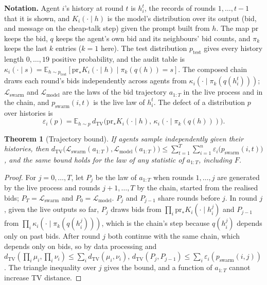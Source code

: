 \documentclass[11pt,letterpaper]{article}
\newtheorem{theorem}{Theorem}
\begin{document}
\textbf{Notation.}
Agent $i$'s history at round $t$ is $h^t_i$, the records of rounds $1, \ldots, t-1$ that it is shown, and $K_i(\cdot \mid h)$ is the model's distribution over its output (bid, and message on the cheap-talk step) given the prompt built from $h$.
The map $\mathrm{pr}$ keeps the bid, $q$ keeps the agent's own bid and its neighbours' bid counts, and $\pi_k$ keeps the last $k$ entries ($k=1$ here).
The test distribution $p_{\mathrm{test}}$ gives every history length $0, \ldots, 19$ positive probability, and the audit table is $\kappa_i(\cdot \mid s) = \mathbb{E}_{h \sim p_{\mathrm{test}}}[\mathrm{pr}_* K_i(\cdot \mid h) \mid \pi_k(q(h)) = s]$.
The composed chain draws each round's bids independently across agents from $\kappa_i(\cdot \mid \pi_k(q(h^t_i)))$; $\mathcal{L}_{\mathrm{swarm}}$ and $\mathcal{L}_{\mathrm{model}}$ are the laws of the bid trajectory $a_{1:T}$ in the live process and in the chain, and $p_{\mathrm{swarm}}(i,t)$ is the live law of $h^t_i$.
The defect of a distribution $p$ over histories is
\[
  \varepsilon_i(p) = \mathbb{E}_{h \sim p}\, d_{\mathrm{TV}}\big(\mathrm{pr}_* K_i(\cdot \mid h),\, \kappa_i(\cdot \mid \pi_k(q(h)))\big).
\]

\begin{theorem}[Trajectory bound]
If agents sample independently given their histories, then
$d_{\mathrm{TV}}\big(\mathcal{L}_{\mathrm{swarm}}(a_{1:T}), \mathcal{L}_{\mathrm{model}}(a_{1:T})\big) \le \sum_{t=1}^{T} \sum_{i=1}^{n} \varepsilon_i\big(p_{\mathrm{swarm}}(i,t)\big)$,
and the same bound holds for the law of any statistic of $a_{1:T}$, including $F$.
\end{theorem}

\begin{proof}
For $j = 0, \ldots, T$, let $P_j$ be the law of $a_{1:T}$ when rounds $1, \ldots, j$ are generated by the live process and rounds $j+1, \ldots, T$ by the chain, started from the realised bids; $P_T = \mathcal{L}_{\mathrm{swarm}}$ and $P_0 = \mathcal{L}_{\mathrm{model}}$.
$P_j$ and $P_{j-1}$ share rounds before $j$.
In round $j$, given the live outputs so far, $P_j$ draws bids from $\prod_i \mathrm{pr}_* K_i(\cdot \mid h^j_i)$ and $P_{j-1}$ from $\prod_i \kappa_i(\cdot \mid \pi_k(q(h^j_i)))$, which is the chain's step because $q(h^j_i)$ depends only on past bids.
After round $j$ both continue with the same chain, which depends only on bids, so by data processing and $d_{\mathrm{TV}}(\prod_i \mu_i, \prod_i \nu_i) \le \sum_i d_{\mathrm{TV}}(\mu_i, \nu_i)$,
$d_{\mathrm{TV}}(P_j, P_{j-1}) \le \sum_i \varepsilon_i(p_{\mathrm{swarm}}(i,j))$.
The triangle inequality over $j$ gives the bound, and a function of $a_{1:T}$ cannot increase TV distance.
\end{proof}
\end{document}
